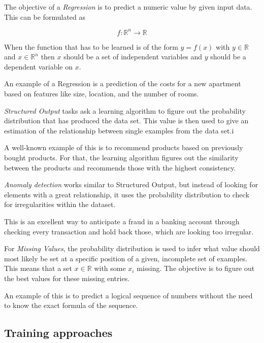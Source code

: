 \documentclass[12pt,english,a4paper,oneside,,tablecaptionabove]{scrbook}
\begin{document}
The objective of a \emph{Regression} is to predict a numeric value by
given input data. This can be formulated as

\begin{equation}\label{eq:regression }

f: \mathbb{R}^n \rightarrow \mathbb{R}

\end{equation}

When the function that has to be learned is of the form \(y=f(x)\) with
\(y \in \mathbb{R}\) and \(x \in \mathbb{R}^n\) then \(x\) should be a
set of independent variables and \(y\) should be a dependent variable on
\(x\).

An example of a Regression is a prediction of the costs for a new
apartment based on features like size, location, and the number of
rooms.

\emph{Structured Output} tasks ask a learning algorithm to figure out
the probability distribution that has produced the data set. This value
is then used to give an estimation of the relationship between single
examples from the data set.i

A well-known example of this is to recommend products based on
previously bought products. For that, the learning algorithm figures out
the similarity between the products and recommends those with the
highest consistency.

\emph{Anomaly detection} works similar to Structured Output, but instead
of looking for elements with a great relationship, it uses the
probability distribution to check for irregularities within the dataset.

This is an excellent way to anticipate a fraud in a banking account
through checking every transaction and hold back those, which are
looking too irregular.

For \emph{Missing Values}, the probability distribution is used to infer
what value should most likely be set at a specific position of a given,
incomplete set of examples. This means that a set \(x \in \mathbb{R}\)
with some \(x_i\) missing. The objective is to figure out the best
values for these missing entries.

An example of this is to predict a logical sequence of numbers without
the need to know the exact formula of the sequence.

\hypertarget{training-approaches}{%
\subsection{\texorpdfstring{\textbf{Training
approaches}}{Training approaches}}\label{training-approaches}}
\end{document}
